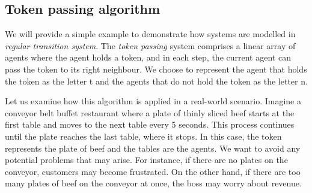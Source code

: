 \subsection*{Token passing algorithm}\label{example:token-passing}
We will provide a simple example to demonstrate how systems are 
modelled in \textit{regular transition system}.
The \textit{token passing} system comprises a linear array of agents where the 
agent holds a token, and in each step, the current agent can pass 
the token to its right neighbour. We choose to represent the agent that holds 
the token as the letter t and the agents that do not hold the token
as the letter n.

Let us examine how this algorithm is applied in a real-world scenario. 
Imagine a conveyor belt buffet restaurant where a plate of thinly sliced beef 
starts at the first table and moves to the next table every 5 seconds. 
This process continues until the plate reaches the last table, where it stops. 
In this case, the token represents the plate of beef and the tables are the agents.
We want to avoid any potential problems that may arise. 
For instance, if there are no plates on the conveyor, customers may become 
frustrated. On the other hand, if there are too many plates of beef on the 
conveyor at once, the boss may worry about revenue.